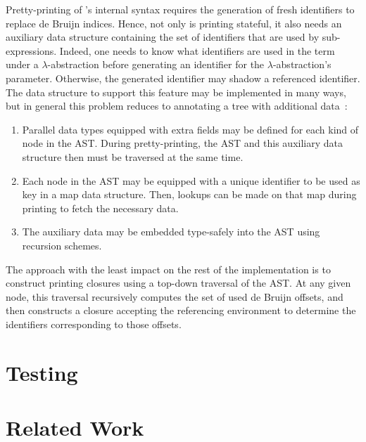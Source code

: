 Pretty-printing of \Beluga's internal syntax requires the generation of fresh identifiers to replace de Bruijn indices.
Hence, not only is printing stateful, it also needs an auxiliary data structure containing the set of identifiers that are used by sub-expressions.
Indeed, one needs to know what identifiers are used in the term under a $\lambda$-abstraction before generating an identifier for the $\lambda$-abstraction's parameter.
Otherwise, the generated identifier may shadow a referenced identifier.
The data structure to support this feature may be implemented in many ways, but in general this problem reduces to annotating a tree with additional data~\cite{najd2016trees}:

\begin{enumerate}
\item
Parallel data types equipped with extra fields may be defined for each kind of node in the \ac{AST}.
During pretty-printing, the \ac{AST} and this auxiliary data structure then must be traversed at the same time.
\item
Each node in the \ac{AST} may be equipped with a unique identifier to be used as key in a map data structure.
Then, lookups can be made on that map during printing to fetch the necessary data.
\item
The auxiliary data may be embedded type-safely into the \ac{AST} using recursion schemes.
\end{enumerate}

The approach with the least impact on the rest of the implementation is to construct printing closures using a top-down traversal of the \ac{AST}.
At any given node, this traversal recursively computes the set of used de Bruijn offsets, and then constructs a closure accepting the referencing environment to determine the identifiers corresponding to those offsets.


\section{Testing}


\section{Related Work}

